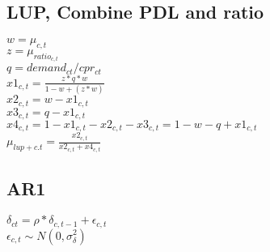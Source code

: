 \documentclass[12pt]{article}
\begin{document}
\subsection{LUP, Combine PDL and ratio}
$ w = \mu_{c,t} $\\
$ z = \mu_{ratio_{c,t}} $ \\
$ q = demand_{ct}/cpr_{ct} $\\
$ x1_{c,t} = \frac{z*q*w}{1-w+(z*w)} $\\
$ x2_{c,t} = w-x1_{c,t}$\\
$ x3_{c,t} = q -x1_{c,t}$\\
$ x4_{c,t} = 1-x1_{c,t} - x2_{c,t} - x3_{c,t} = 1 - w - q + x1_{c,t} $\\
$ \mu_{lup+{c.t}} = \frac{x2_{c,t}}{x2_{c,t}+ x4_{c,t} } $ \\

\subsection{AR1}
\noindent
 $ \delta_{ct} = \rho*\delta_{c,t-1}+\epsilon_{c,t} $ \\
 $ \epsilon_{c,t} \sim N(0,\sigma^2_\delta) $ \\ 
\newpage
\end{document}
